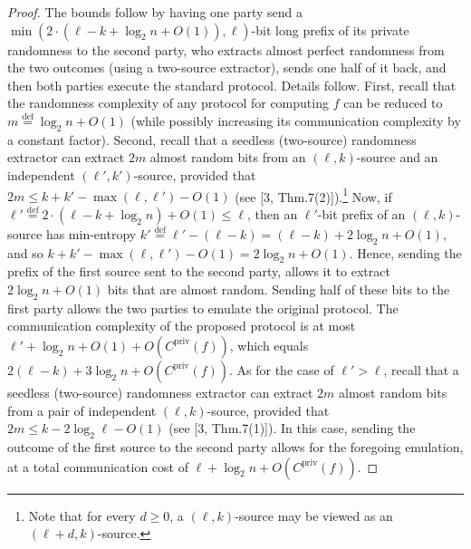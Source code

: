 \begin{proof}
The bounds follow by having one party send a $\min(2\cdot(\ell-k+\log_2n+O(1)),\ell)$-bit long prefix of its private randomness to the second party, who extracts almost perfect randomness from the two outcomes (using a two-source extractor), sends one half of it back, and then both parties execute the standard protocol. Details follow.
First, recall that the randomness complexity of any protocol for computing $f$ can be reduced to $m\stackrel{\mathrm{def}}=\log_2n+O(1)$ (while possibly increasing its communication complexity by a constant factor). Second, recall that a seedless (two-source) randomness extractor can extract $2m$ almost random bits from an $(\ell,k)$-source and an independent $(\ell',k')$-source, provided that $2m\le k+k'-\max(\ell,\ell')-O(1)$ (see [3, Thm.7(2)]).\footnote{Note that for every $d\ge0$, a $(\ell,k)$-source may be viewed as an $(\ell+d,k)$-source.} Now, if $\ell'\stackrel{\mathrm{def}}=2\cdot(\ell-k+\log_2n)+O(1)\le\ell$, then an $\ell'$-bit prefix of an $(\ell,k)$-source has min-entropy $k'\stackrel{\mathrm{def}}=\ell'-(\ell-k)=(\ell-k)+2\log_2n+O(1)$, and so $k+k'-\max(\ell,\ell')-O(1)=2\log_2n+O(1)$. Hence, sending the prefix of the first source sent to the second party, allows it to extract $2\log_2n+O(1)$ bits that are almost random. Sending half of these bits to the first party allows the two parties to emulate the original protocol. The communication complexity of the proposed protocol is at most $\ell'+\log_2n+O(1)+O(C^{\mathrm{priv}}(f))$, which equals $2(\ell-k)+3\log_2n+O(C^{\mathrm{priv}}(f))$.
As for the case of $\ell'>\ell$, recall that a seedless (two-source) randomness extractor can extract $2m$ almost random bits from a pair of independent $(\ell,k)$-source, provided that $2m\le k-2\log_2\ell-O(1)$ (see [3, Thm.7(1)]). In this case, sending the outcome of the first source to the second party allows for the foregoing emulation, at a total communication cost of $\ell+\log_2n+O(C^{\mathrm{priv}}(f))$.
\end{proof}
